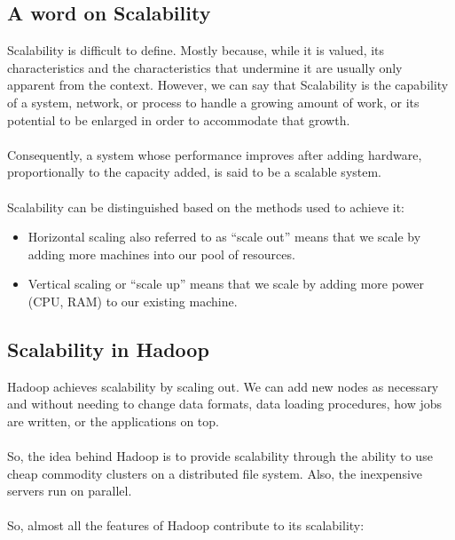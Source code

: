 \documentclass[a4paper,12pt,oneside]{report}
\begin{document}
\subsection{A word on Scalability}

Scalability is difficult to define. \cite{Hill1990} Mostly because, while it is valued, its characteristics and
the characteristics that undermine it are usually only apparent from the context. However,
we can say that Scalability is the capability of a system, network, or process to handle a
growing amount of work, or its potential to be enlarged in order to accommodate that
growth. \cite{Bondi2000}\\
\\
Consequently, a system whose performance improves after adding hardware,
proportionally to the capacity added, is said to be a scalable system.\\
\\
Scalability can be distinguished based on the methods used to achieve it:
\begin{itemize}
        \item Horizontal scaling also referred to as “scale out” means that we scale by adding more
machines into our pool of resources.
\item Vertical scaling or “scale up” means that we scale by adding more power (CPU, RAM) to
our existing machine.
\end{itemize}

\subsection{Scalability in Hadoop}

Hadoop achieves scalability by scaling out. We can add new nodes as necessary and without needing to change data formats, data loading procedures, how jobs are written, or the applications on top.\\
\\
So, the idea behind Hadoop is to provide scalability through the ability to use cheap commodity clusters on a distributed file system. 
Also, the inexpensive servers run on parallel.\\ 
\\
So, almost all the features of Hadoop contribute to its scalability:
\end{document}
